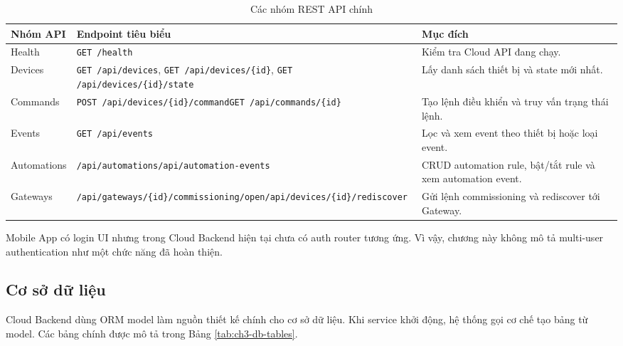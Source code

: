 \begin{table}[H]
    \centering
    \caption{Các nhóm REST API chính}
    \label{tab:ch3-api-groups}
    \footnotesize
    \setlength{\tabcolsep}{3pt}
    \begin{tabular}{|>{\raggedright\arraybackslash}p{3.0cm}|>{\raggedright\arraybackslash}p{5.2cm}|>{\raggedright\arraybackslash}p{5.0cm}|}
        \hline
        \textbf{Nhóm API} & \textbf{Endpoint tiêu biểu} & \textbf{Mục đích} \\
        \hline
        Health & \texttt{GET /health} & Kiểm tra Cloud API đang chạy. \\
        \hline
        Devices & \texttt{GET /api/devices}, \texttt{GET /api/devices/\{id\}}, \texttt{GET /api/devices/\{id\}/state} & Lấy danh sách thiết bị và state mới nhất. \\
        \hline
        Commands & \texttt{POST /api/devices/\{id\}/command}\newline\texttt{GET /api/commands/\{id\}} & Tạo lệnh điều khiển và truy vấn trạng thái lệnh. \\
        \hline
        Events & \texttt{GET /api/events} & Lọc và xem event theo thiết bị hoặc loại event. \\
        \hline
        Automations & \texttt{/api/automations}\newline\texttt{/api/automation-events} & CRUD automation rule, bật/tắt rule và xem automation event. \\
        \hline
        Gateways & \texttt{/api/gateways/\{id\}/}\newline\texttt{commissioning/open}\newline\texttt{/api/devices/\{id\}/rediscover} & Gửi lệnh commissioning và rediscover tới Gateway. \\
        \hline
    \end{tabular}
    \setlength{\tabcolsep}{6pt}
\end{table}

Mobile App có login UI nhưng trong Cloud Backend hiện tại chưa có auth router tương ứng. Vì vậy, chương này không mô tả multi-user authentication như một chức năng đã hoàn thiện.

\subsection{Cơ sở dữ liệu}
\label{sec:ch3-database}

Cloud Backend dùng ORM model làm nguồn thiết kế chính cho cơ sở dữ liệu. Khi service khởi động, hệ thống gọi cơ chế tạo bảng từ model. Các bảng chính được mô tả trong Bảng \ref{tab:ch3-db-tables}.

